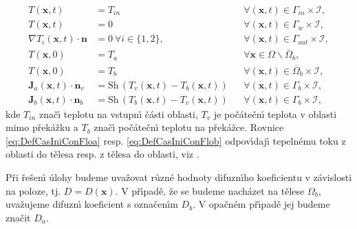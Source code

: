         \begin{subequations}
            \label{eq:DefCasConADE3D}
            \begin{align}
                T (\boldsymbol{x},t) &= T_{in}  & &\forall (\boldsymbol{x},t) \in \Gamma_{in} \times \mathcal{I}, \label{eq:DefCasConInl33}\\
                T (\boldsymbol{x},t) &= 0 & &\forall (\boldsymbol{x},t) \in \Gamma_{w} \times \mathcal{I}, \label{eq:DefCasConWal33} \\
                \nabla T_i (\boldsymbol{x},t) \cdot \boldsymbol{n} &= 0 \ \forall i \in \{ 1,2 \}, & &\forall(\boldsymbol{x},t) \in \Gamma_{out} \times \mathcal{I},  \label{eq:DefCasConOut33} \\
                T (\boldsymbol{x},0) &= T_{a} & &\forall \boldsymbol{x} \in \Omega \backslash \overline{\Omega}_{b}, \label{eq:DefCasIniCon33} \\
                T (\boldsymbol{x},0) &= T_b & &\forall(\boldsymbol{x},t) \in \overline{\Omega}_{b} \times \mathcal{I},  \label{eq:DefCasConOut333} \\
                \boldsymbol{J}_{a}(\boldsymbol{x}, t) \cdot \boldsymbol{n}_v &= \mathrm{Sh}\,( T_v(\boldsymbol{x},t) - T_b(\boldsymbol{x},t)) & &\forall (\boldsymbol{x}, t) \in \Gamma_{b} \times \mathcal{I}, \label{eq:DefCasIniConFloa} \\
                \boldsymbol{J}_{b}(\boldsymbol{x}, t) \cdot \boldsymbol{n}_b &= \mathrm{Sh} \,( T_b(\boldsymbol{x},t) - T_v(\boldsymbol{x},t)) & &\forall (\boldsymbol{x}, t) \in \Gamma_{b} \times \mathcal{I}, \label{eq:DefCasIniConFlob} 
            \end{align}
            \end{subequations}
            kde $T_{in}$ zna\v{c}\'{\i} teplotu na vstupn\'{\i} \v{c}\'{a}sti oblasti, $T_{v}$ je po\v{c}\'{a}te\v{c}n\'{\i} teplota v oblasti mimo p\v{r}ek\'{a}\v{z}ku a $T_{b}$ zna\v{c}\'{\i} po\v{c}\'{a}te\v{c}n\'{\i} teplotu na p\v{r}ek\'{a}\v{z}ce. Rovnice \eqref{eq:DefCasIniConFloa} resp. \eqref{eq:DefCasIniConFlob} odpov\'{\i}daj\'{\i} tepeln\'{e}mu toku z oblasti do t\v{e}lesa resp. z t\v{e}lesa do oblasti, viz \cite{mika1999chemicke}. 

            P\v{r}i \v{r}e\v{s}en\'{\i} \'{u}lohy budeme uva\v{z}ovat r\r{u}zn\'{e} hodnoty difuzn\'{\i}ho koeficientu v z\'{a}vislosti na poloze, tj. $D = D(\boldsymbol{x})$. V p\v{r}\'{\i}pad\v{e}, \v{z}e se budeme nach\'{a}zet na t\v{e}lese $\Omega_b$, uva\v{z}ujeme difuzn\'{\i} koeficient s ozna\v{c}en\'{\i}m $D_b$. V opa\v{c}n\'{e}m p\v{r}\'{\i}pad\v{e} jej budeme zna\v{c}it $D_a$.
        
